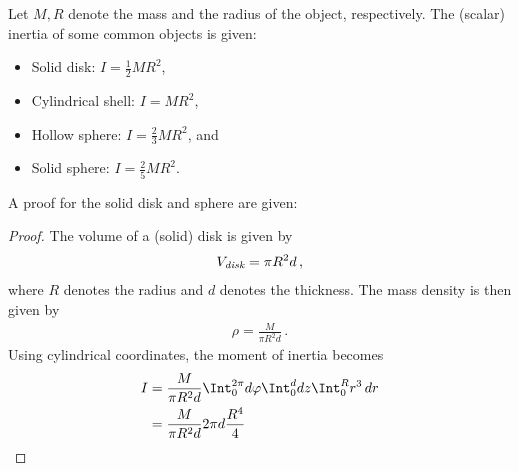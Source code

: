 
    \begin{example}
        Let $M,R$ denote the mass and the radius of the object, respectively. The (scalar) inertia of some common objects is given:
        \begin{itemize}
            \item Solid disk: $I = \frac{1}{2}MR^2$,
            \item Cylindrical shell: $I = MR^2$,
            \item Hollow sphere: $I = \frac{2}{3}MR^2$, and
            \item Solid sphere: $I = \frac{2}{5}MR^2$.
        \end{itemize}
        A proof for the solid disk and sphere are given:
        \begin{mdframed}[roundcorner=10pt, linecolor=blue, linewidth=1pt]
            \begin{proof}
                The volume of a (solid) disk is given by
                \begin{gather*}
                    V_{\emph{disk}}=\pi R^2d\,,
                \end{gather*}
                where $R$ denotes the radius and $d$ denotes the thickness. The mass density is then given by
                \begin{gather*}
                    \rho=\frac{M}{\pi R^2d}\,.
                \end{gather*}
                Using cylindrical coordinates, the moment of inertia becomes
                \begin{align*}
                    I &= \frac{M}{\pi R^2d}\Int_0^{2\pi}d\varphi\Int_0^ddz\Int_0^Rr^3\,dr\\
                    &= \frac{M}{\pi R^2d}2\pi d\frac{R^4}{4}\\

\end{align*}
\end{proof}
\end{mdframed}
\end{example}
